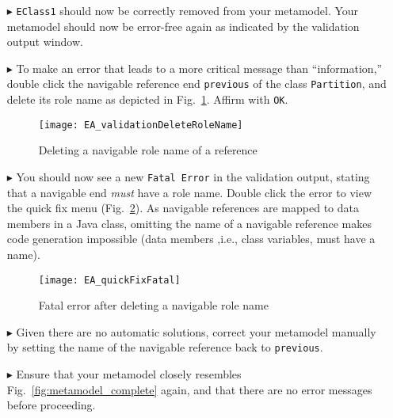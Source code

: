 \begin{enumerate}
\item[$\blacktriangleright$] \texttt{EClass1} should now be correctly removed from your metamodel. Your metamodel should now be error-free again as indicated by
the validation output window.

\item[$\blacktriangleright$] To make an error that leads to a more critical message than ``information,'' double click the navigable reference end
\texttt{previous} of the class \texttt{Partition}, and delete its role name as depicted in Fig.~\ref{fig:delete-role-name}. Affirm with \texttt{OK}.

\begin{figure}[htbp]
    \centering
  \texttt{[image: EA\_validationDeleteRoleName]}
    \caption{Deleting a navigable role name of a reference}
    \label{fig:delete-role-name}
\end{figure}

\item[$\blacktriangleright$] You should now see a new \texttt{Fatal Error} in the validation output, stating that a navigable end \emph{must} have a role name.
Double click the error to view the quick fix menu (Fig.~\ref{fig:fatal-error}). As navigable references are mapped to data members in a Java class, omitting the
name of a navigable reference makes code generation impossible (data members ,i.e., class variables, must have a name).

\begin{figure}[htbp]
	\centering
  \texttt{[image: EA\_quickFixFatal]}
	\caption{Fatal error after deleting a navigable role name}
	\label{fig:fatal-error}
\end{figure}

\item[$\blacktriangleright$] Given there are no automatic solutions, correct your metamodel manually by setting the name of the navigable reference back to
\texttt{previous}.

\item[$\blacktriangleright$] Ensure that your metamodel closely resembles Fig.~\ref{fig:metamodel_complete} again, and that there are no error messages before
proceeding.
\end{enumerate}

\vspace*{1cm}

